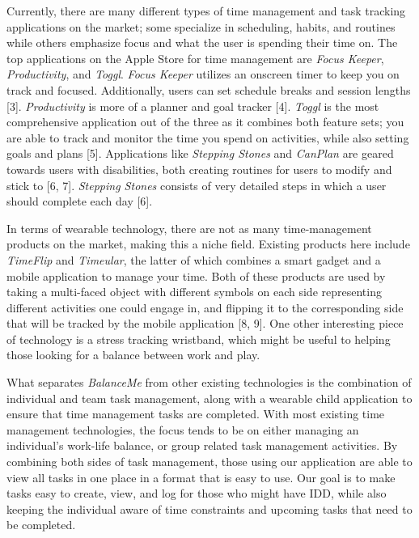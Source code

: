 \documentclass{sigchi}
\begin{document}
Currently, there are many different types of time management and task tracking
applications on the market; some specialize in scheduling, habits, and routines
while others emphasize focus and what the user is spending their time on. The
top applications on the Apple Store for time management are
\textit{Focus Keeper}, \textit{Productivity}, and \textit{Toggl}.
\textit{Focus Keeper} utilizes an onscreen timer to keep you on track and
focused. Additionally, users can set schedule breaks and session lengths [3].
\textit{Productivity} is more of a planner and goal tracker [4]. \textit{Toggl}
is the most comprehensive application out of the three as it combines both
feature sets; you are able to track and monitor the time you spend on
activities, while also setting goals and plans [5]. Applications like
\textit{Stepping Stones} and \textit{CanPlan} are geared towards users with
disabilities, both creating routines for users to modify and stick to [6, 7].
\textit{Stepping Stones} consists of very detailed steps in which a user should
complete each day [6].

In terms of wearable technology, there are not as many time-management products
on the market, making this a niche field. Existing products here include
\textit{TimeFlip} and \textit{Timeular}, the latter of which combines a smart
gadget and a mobile application to manage your time. Both of these products are
used by taking a multi-faced object with different symbols on each side
representing different activities one could engage in, and flipping it to the
corresponding side that will be tracked by the mobile application [8, 9]. One
other interesting piece of technology is a stress tracking wristband, which
might be useful to helping those looking for a balance between work and play.

What separates \textit{BalanceMe} from other existing technologies is the
combination of individual and team task management, along with a wearable
child application to ensure that time management tasks are completed. With
most existing time management technologies, the focus tends to be on either
managing an individual’s work-life balance, or group related task management
activities. By combining both sides of task management, those using our
application are able to view all tasks in one place in a format that is easy to
use. Our goal is to make tasks easy to create, view, and log for those who
might have IDD, while also keeping the individual aware of time constraints and
upcoming tasks that need to be completed.
\end{document}
